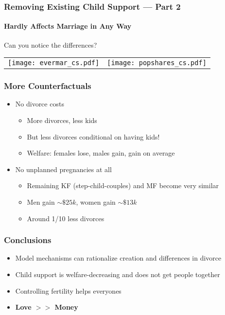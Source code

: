 \documentclass[aspectratio=169]{beamer}
\let\olditem\item
\renewcommand{\item}{%
\olditem\vspace{\fill}}
\begin{document}
\begin{frame}[label=counterfactuals-child-support]
\frametitle{Removing Existing Child Support --- Part 2}
\framesubtitle{Hardly Affects Marriage in Any Way}
Can you notice the differences?
\begin{center}
\begin{tabular}{c c}
\hspace{-1cm}\texttt{[image: evermar\_cs.pdf]}  & \hspace{-0.5cm} \texttt{[image: popshares\_cs.pdf]} 
\end{tabular}
\end{center}
\end{frame}



\begin{frame}[label=cf]
\frametitle{More Counterfactuals}
\begin{itemize}
\item No divorce costs \hyperlink{no_divorce_costs}{}
\begin{itemize}
\item More divorces, less kids
\item But less divorces conditional on having kids!
\item Welfare: females lose, males gain, gain on average
\end{itemize}
\item No unplanned pregnancies at all 
\begin{itemize}
\item Remaining KF (step-child-couples) and MF become very similar
\item Men gain $\sim \$25k$, women gain $\sim \$13k$ 
\item Around 1/10 less divorces
\end{itemize}
\end{itemize}
\end{frame}



\begin{frame}[label=cf]
\frametitle{Conclusions}
\begin{itemize}
\item Model mechanisms can rationalize creation and differences in divorce
\item Child support is welfare-decreasing and does not get people together
\item Controlling fertility helps everyones
\item \textbf{Love $>>$ Money}
\end{itemize}
\end{frame}
\end{document}
